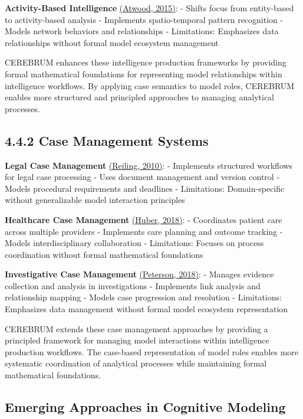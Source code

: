 \documentclass[
  11pt,
  letterpaper,
]{article}
\begin{document}
\textbf{Activity-Based Intelligence}
\protect\hyperlink{references}{(Atwood, 2015)}: - Shifts focus from
entity-based to activity-based analysis - Implements spatio-temporal
pattern recognition - Models network behaviors and relationships -
Limitations: Emphasizes data relationships without formal model
ecosystem management

CEREBRUM enhances these intelligence production frameworks by providing
formal mathematical foundations for representing model relationships
within intelligence workflows. By applying case semantics to model
roles, CEREBRUM enables more structured and principled approaches to
managing analytical processes.

\hypertarget{case-management-systems}{%
\subsection{4.4.2 Case Management
Systems}\label{case-management-systems}}

\textbf{Legal Case Management} \protect\hyperlink{references}{(Reiling,
2010)}: - Implements structured workflows for legal case processing -
Uses document management and version control - Models procedural
requirements and deadlines - Limitations: Domain-specific without
generalizable model interaction principles

\textbf{Healthcare Case Management}
\protect\hyperlink{references}{(Huber, 2018)}: - Coordinates patient
care across multiple providers - Implements care planning and outcome
tracking - Models interdisciplinary collaboration - Limitations: Focuses
on process coordination without formal mathematical foundations

\textbf{Investigative Case Management}
\protect\hyperlink{references}{(Peterson, 2018)}: - Manages evidence
collection and analysis in investigations - Implements link analysis and
relationship mapping - Models case progression and resolution -
Limitations: Emphasizes data management without formal model ecosystem
representation

CEREBRUM extends these case management approaches by providing a
principled framework for managing model interactions within intelligence
production workflows. The case-based representation of model roles
enables more systematic coordination of analytical processes while
maintaining formal mathematical foundations.

\hypertarget{emerging-approaches-in-cognitive-modeling}{%
\subsection{Emerging Approaches in Cognitive
Modeling}\label{emerging-approaches-in-cognitive-modeling}}
\end{document}
